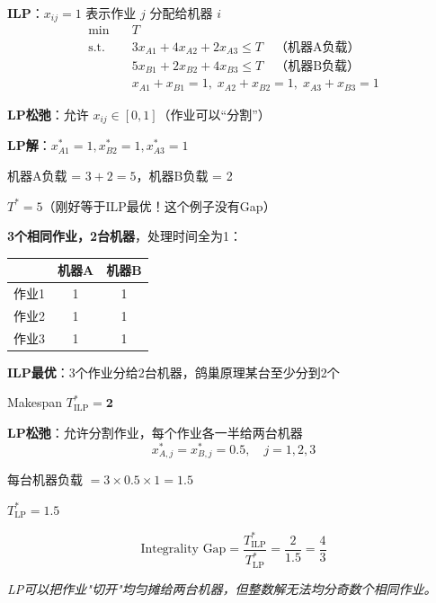 \documentclass[12pt, a4paper]{ctexart}
\begin{document}
\begin{blackboard}

\textbf{ILP}：$x_{ij} = 1$ 表示作业 $j$ 分配给机器 $i$
\begin{align*}
\min \quad & T \\
\text{s.t.} \quad & 3x_{A1} + 4x_{A2} + 2x_{A3} \leq T \quad \text{（机器A负载）} \\
& 5x_{B1} + 2x_{B2} + 4x_{B3} \leq T \quad \text{（机器B负载）} \\
& x_{A1} + x_{B1} = 1, \; x_{A2} + x_{B2} = 1, \; x_{A3} + x_{B3} = 1
\end{align*}

\textbf{LP松弛}：允许 $x_{ij} \in [0,1]$（作业可以``分割''）

\textbf{LP解}：$x_{A1}^* = 1, x_{B2}^* = 1, x_{A3}^* = 1$

机器A负载 = $3 + 2 = 5$，机器B负载 = 2

$T^* = 5$（刚好等于ILP最优！这个例子没有Gap）

\end{blackboard}

\begin{blackboard}

\textbf{3个相同作业，2台机器}，处理时间全为1：

\begin{center}
\begin{tabular}{c|c|c}
& 机器A & 机器B \\
\hline
作业1 & 1 & 1 \\
作业2 & 1 & 1 \\
作业3 & 1 & 1
\end{tabular}
\end{center}

\textbf{ILP最优}：3个作业分给2台机器，鸽巢原理某台至少分到2个

Makespan $T^*_{\text{ILP}} = \mathbf{2}$

\textbf{LP松弛}：允许分割作业，每个作业各一半给两台机器
\[
x_{A,j}^* = x_{B,j}^* = 0.5, \quad j = 1,2,3
\]

每台机器负载 $= 3 \times 0.5 \times 1 = 1.5$

$T^*_{\text{LP}} = \mathbf{1.5}$

\[
\boxed{\text{Integrality Gap} = \frac{T^*_{\text{ILP}}}{T^*_{\text{LP}}} = \frac{2}{1.5} = \frac{4}{3}}
\]

\textit{LP可以把作业"切开"均匀摊给两台机器，但整数解无法均分奇数个相同作业。}

\end{blackboard}
\end{document}
